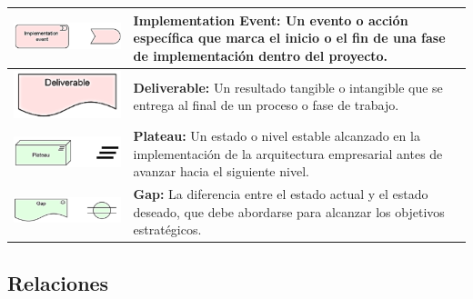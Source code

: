 \begin{longtable}{|c|p{8cm}|}
\hline
\includegraphics{apendices/ARCHI/strategy/event.png} & 
\textbf{Implementation Event:} Un evento o acción específica que marca el inicio o el fin de una fase de implementación dentro del proyecto. \\
\hline
\includegraphics{apendices/ARCHI/strategy/deliverable.png} & 
\textbf{Deliverable:} Un resultado tangible o intangible que se entrega al final de un proceso o fase de trabajo. \\
\hline
\includegraphics{apendices/ARCHI/strategy/plateau.png} & 
\textbf{Plateau:} Un estado o nivel estable alcanzado en la implementación de la arquitectura empresarial antes de avanzar hacia el siguiente nivel. \\
\hline
\includegraphics{apendices/ARCHI/strategy/gap.png} & 
\textbf{Gap:} La diferencia entre el estado actual y el estado deseado, que debe abordarse para alcanzar los objetivos estratégicos. \\
\hline
\end{longtable}

\subsection{Relaciones}

